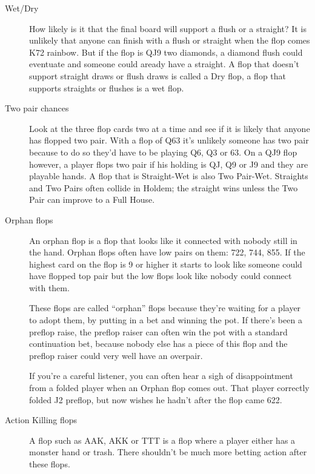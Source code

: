 \begin{description}

\item[Wet/Dry] How likely is it that the final board will support a
flush or a straight? It is unlikely that anyone can finish with a
flush or straight when the flop comes K72 rainbow. But if the flop is
QJ9 two diamonds, a diamond flush could eventuate and someone could
aready have a straight. A flop that doesn't support straight draws or
flush draws is called a Dry flop, a flop that supports straights or
flushes is a wet flop.

\item[Two pair chances] Look at the three flop cards two at a time and
see if it is likely that anyone has flopped two pair. With a flop of
Q63 it's unlikely someone has two pair because to do so they'd have to
be playing Q6, Q3 or 63. On a QJ9 flop however, a player flops two
pair if his holding is QJ, Q9 or J9 and they are playable hands.
A flop that is Straight-Wet is also Two Pair-Wet. Straights and Two
Pairs often collide in Holdem; the straight wins unless the Two Pair
can improve to a Full House.

\item[Orphan flops] An orphan flop is a flop that looks like it
connected with nobody still in the hand. Orphan flops often have low
pairs on them: 722, 744, 855. If the highest card on the flop is 9 or
higher it starts to look like someone could have flopped top pair but
the low flops look like nobody could connect with them.

These flops are called ``orphan'' flops because they're waiting for a
player to adopt them, by putting in a bet and winning the pot. If
there's been a preflop raise, the preflop raiser can often win the pot
with a standard continuation bet, because nobody else has a piece of
this flop and the preflop raiser could very well have an overpair.

If you're a careful listener, you can often hear a sigh of
disappointment from a folded player when an Orphan flop comes out.
That player correctly folded J2 preflop, but now wishes he hadn't
after the flop came 622.

\item[Action Killing flops] A flop such as AAK, AKK or TTT is a flop
where a player either has a monster hand or trash. There shouldn't be
much more betting action after these flops.

\end{description}
